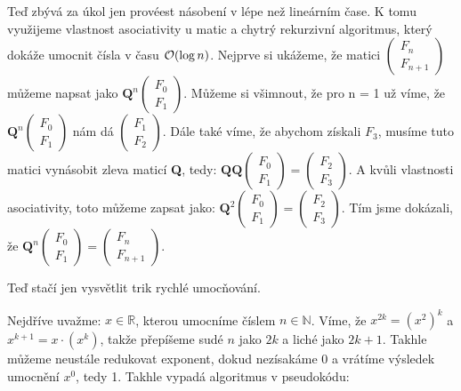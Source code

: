\documentclass{../../../ksp}
\begin{document}
Teď zbývá za úkol jen provéest násobení v lépe než lineárním čase.
K tomu využijeme vlastnost asociativity u matic a chytrý rekurzivní algoritmus, který dokáže umocnit čísla v času $\mathcal{O}(\log{n})$.
Nejprve si ukážeme, že matici
$\begin{pmatrix}
    F_n\\
    F_{n+1}
\end{pmatrix}$
můžeme napsat jako
$ \mathbf{Q}^n
\begin{pmatrix}
    F_0\\
    F_{1}
\end{pmatrix}$.
Můžeme si všimnout, že pro n = 1 už víme, že
$ \mathbf{Q}^n
\begin{pmatrix}
    F_0\\
    F_{1}
\end{pmatrix}$
nám dá
$\begin{pmatrix}
    F_1\\
    F_{2}
\end{pmatrix}$.
Dále také víme, že abychom získali $F_3$, musíme tuto matici vynásobit zleva maticí \textbf{Q}, tedy:
$ \mathbf{Q}\mathbf{Q}
\begin{pmatrix}
    F_0\\
    F_{1}
\end{pmatrix}
=
\begin{pmatrix}
    F_2\\
    F_{3}
\end{pmatrix}$.
A kvůli vlastnosti asociativity, toto můžeme zapsat jako:
$ \mathbf{Q}^2
\begin{pmatrix}
    F_0\\
    F_{1}
\end{pmatrix}
=
\begin{pmatrix}
    F_2\\
    F_{3}
\end{pmatrix}$.
Tím jsme dokázali, že
$ \mathbf{Q}^n
\begin{pmatrix}
    F_0\\
    F_{1}
\end{pmatrix}
=
\begin{pmatrix}
    F_n\\
    F_{n+1}
\end{pmatrix}$.

\indent

Teď stačí jen vysvětlit trik rychlé umocňování.

Nejdříve uvažme: $x\in\mathbb{R}$, kterou umocníme číslem $n\in\mathbb{N}$.
Víme, že $x^{2k} = (x^{2})^{k}$ a $x^{k+1} = x\cdot (x^{k})$, takže přepíšeme sudé $n$ jako $2k$ a liché jako $2k+1$.
Takhle můžeme neustále redukovat exponent, dokud nezísakáme 0 a vrátíme výsledek umocnění $x^0$, tedy 1.
Takhle vypadá algoritmus v pseudokódu:
\end{document}
